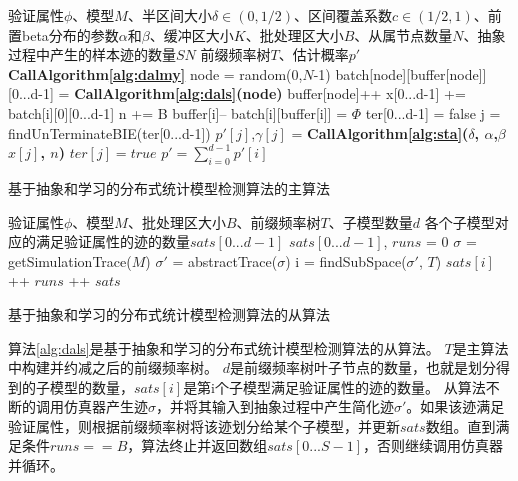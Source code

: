 \begin{algorithm}[t]
\begin{algorithmic}[1]
\REQUIRE 验证属性$\phi$、模型$M$、半区间大小$\delta \in (0, 1/2)$、区间覆盖系数$c \in (1/2, 1)$、前置beta分布的参数$\alpha$和$\beta$、缓冲区大小$K$、批处理区大小$B$、从属节点数量$N$、抽象过程中产生的样本迹的数量$SN$
\ENSURE 前缀频率树$T$、估计概率$p'$
\STATE \textbf{CallAlgorithm\ref{alg:dalmy}}
\LOOP
        \STATE node = random(0,$N$-1)
           \STATE batch[node][buffer[node]][0...d-1] = \textbf{CallAlgorithm\ref{alg:dals}(node)}
           \STATE buffer[node]++
        \ENDIF
        \LOOP
         \STATE x[0...d-1] += batch[i][0][0...d-1]
          \STATE n += B
           \STATE buffer[i]--
           \STATE batch[i][buffer[i]] = $\Phi$
         \RETURN
         \ENDIF    
         \ENDLOOP
         \ENDIF
          \STATE ter[0...d-1] = false
         \STATE  j = findUnTerminateBIE(ter[0...d-1])
          \STATE $p'[j]$,$\gamma[j]$ = \textbf{CallAlgorithm\ref{alg:sta}($\delta$, $\alpha$,$\beta$ $x[j]$, $n$)}
            \STATE $ter[j] = true$
         \ENDIF
         \RETURN
         \ENDIF
\ENDLOOP
\RETURN $p' = \sum\limits_{i=0}^{d-1} p'[i]$
\end{algorithmic}
\caption{基于抽象和学习的分布式统计模型检测算法的主算法}
\label{alg:dalm}
\end{algorithm}
\begin{algorithm}[t]
\begin{algorithmic}[1]
\REQUIRE 验证属性$\phi$、模型$M$、批处理区大小$B$、前缀频率树$T$、子模型数量$d$
\ENSURE 各个子模型对应的满足验证属性的迹的数量$sats[0...d-1]$
\STATE $sats[0...d-1]$, $runs$ = 0
\LOOP
        \STATE $\sigma$ = getSimulationTrace($M$)
        \STATE $\sigma'$ = abstractTrace($\sigma$)
        \IF{$\sigma \models \phi$}
           \STATE i = findSubSpace($\sigma'$, $T$)
           \STATE $sats[i]$ ++
         \ENDIF
        \STATE $runs$ ++ 
\RETURN $sats$
\ENDIF
\ENDLOOP
\end{algorithmic}
\caption{基于抽象和学习的分布式统计模型检测算法的从算法}
\label{alg:dals}
\end{algorithm}
算法\ref{alg:dals}是基于抽象和学习的分布式统计模型检测算法的从算法。 $T$是主算法中构建并约减之后的前缀频率树。 $d$是前缀频率树叶子节点的数量，也就是划分得到的子模型的数量，$sats[i]$是第i个子模型满足验证属性的迹的数量。 从算法不断的调用仿真器产生迹$\sigma$，并将其输入到抽象过程中产生简化迹$\sigma'$。如果该迹满足验证属性，则根据前缀频率树将该迹划分给某个子模型，并更新$sats$数组。直到满足条件$runs == B$，算法终止并返回数组$sats[0...S-1]$，否则继续调用仿真器并循环。

